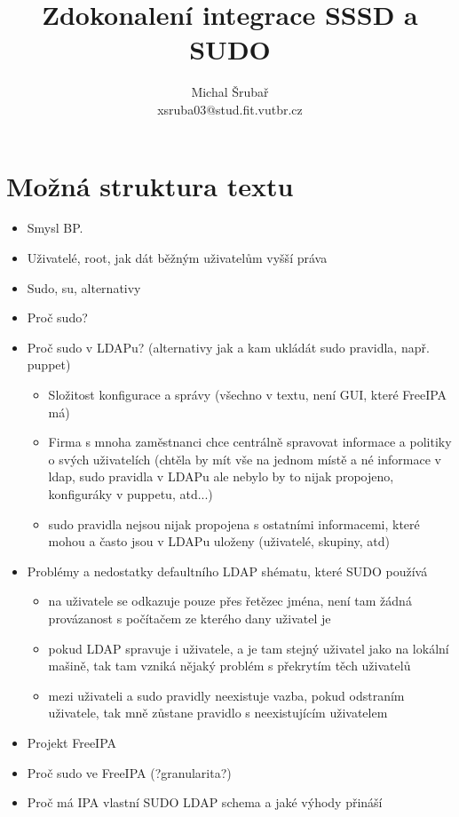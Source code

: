 \documentclass[10pt,a4paper,notitlepage]{article}
\author{Michal Šrubař\\xsruba03@stud.fit.vutbr.cz}
\date{}
\title{Zdokonalení integrace SSSD a SUDO}
\begin{document}
\maketitle

\section*{Možná struktura textu}
\begin{itemize}
	\item	Smysl BP.
	\item Uživatelé, root, jak dát běžným uživatelům vyšší práva
	\item Sudo, su, alternativy
	\item Proč sudo?
	\item	Proč sudo v LDAPu? (alternativy jak a kam ukládát sudo pravidla, např.
		puppet)

	\begin{itemize}
		\item Složitost konfigurace a správy (všechno v textu, není GUI, které FreeIPA má)
		\item Firma s mnoha zaměstnanci chce centrálně spravovat informace a
			politiky o svých uživatelích (chtěla by mít vše na jednom místě a né
			informace v ldap, sudo pravidla v LDAPu ale nebylo by to nijak propojeno,
			konfiguráky v puppetu, atd...)
		\item sudo pravidla nejsou nijak propojena s ostatními informacemi, které
			mohou a často jsou v LDAPu uloženy (uživatelé, skupiny, atd)
	\end{itemize}
	
	\item Problémy a nedostatky defaultního LDAP shématu, které SUDO používá
	\begin{itemize}
		\item na uživatele se odkazuje pouze přes řetězec jména, není tam žádná
			provázanost s počítačem ze kterého dany uživatel je
		\item pokud LDAP spravuje i uživatele, a je tam stejný uživatel jako na
			lokální mašině, tak tam vzniká nějaký problém s překrytím těch uživatelů
		\item mezi uživateli a sudo pravidly neexistuje vazba, pokud odstraním
			uživatele, tak mně zůstane pravidlo s neexistujícím uživatelem
	\end{itemize}
	\item Projekt FreeIPA
	\item Proč sudo ve FreeIPA (?granularita?)
	\item Proč má IPA vlastní SUDO LDAP schema a jaké výhody přináší


\end{itemize}
\end{document}
